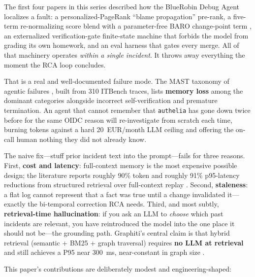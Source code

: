 \documentclass[11pt]{article}
\begin{document}
The first four papers in this series described how the BlueRobin Debug Agent
localizes a fault: a personalized-PageRank ``blame propagation'' pre-rank, a
five-term re-normalizing score blend with a parameter-free BARO change-point term
\citep{pham2024baro}, an externalized verification-gate finite-state machine that
forbids the model from grading its own homework, and an eval harness that gates
every merge. All of that machinery operates \emph{within a single incident}. It
throws away everything the moment the RCA loop concludes.

That is a real and well-documented failure mode. The MAST taxonomy of agentic
failures \citep{cemri2025mast}, built from 310 ITBench traces, lists
\textbf{memory loss} among the dominant categories alongside incorrect
self-verification and premature termination. An agent that cannot remember that
\texttt{authelia} has gone down twice before for the same OIDC reason will
re-investigate from scratch each time, burning tokens against a hard
20~EUR/month LLM ceiling and offering the on-call human nothing they did not
already know.

The naive fix---stuff prior incident text into the prompt---fails for three
reasons. First, \textbf{cost and latency}: full-context memory is the most
expensive possible design; the literature reports roughly 90\% token and roughly
91\% p95-latency reductions from structured retrieval over full-context replay
\citep{chhikara2025mem0}. Second, \textbf{staleness}: a flat log cannot represent
that a fact was true until a change invalidated it---exactly the bi-temporal
correction RCA needs. Third, and most subtly, \textbf{retrieval-time
hallucination}: if you ask an LLM to \emph{choose} which past incidents are
relevant, you have reintroduced the model into the one place it should not
be---the grounding path. Graphiti's central claim is that hybrid retrieval
(semantic + BM25 + graph traversal) requires \textbf{no LLM at retrieval} and
still achieves a P95 near 300~ms, near-constant in graph size
\citep{rasmussen2025zep}.

This paper's contributions are deliberately modest and engineering-shaped:
\end{document}
